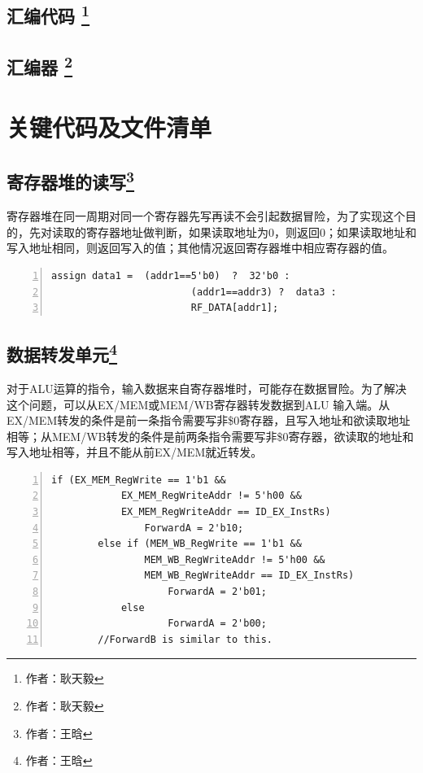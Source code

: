 \documentclass{article}
\begin{document}
        \subsection{汇编代码 \protect\footnote{作者：耿天毅}}

        \subsection{汇编器 \protect\footnote{作者：耿天毅}}

    \section{关键代码及文件清单}
        \subsection{寄存器堆的读写\protect\footnote{作者：王晗}}
            寄存器堆在同一周期对同一个寄存器先写再读不会引起数据冒险，为了实现这个目的，先对读取的寄存器地址做判断，如果读取地址为0，则返回0；如果读取地址和写入地址相同，则返回写入的值；其他情况返回寄存器堆中相应寄存器的值。
            \begin{Verbatim}[frame=lines,numbers=left,stepnumber=5,label={regfile.v}]
        assign data1 =  (addr1==5'b0)  ?  32'b0 :
                        (addr1==addr3) ?  data3 :
                        RF_DATA[addr1];
            \end{Verbatim}
            
        \subsection{数据转发单元\protect\footnote{作者：王晗}}
            对于ALU运算的指令，输入数据来自寄存器堆时，可能存在数据冒险。为了解决这个问题，可以从EX/MEM或MEM/WB寄存器转发数据到ALU 输入端。从EX/MEM转发的条件是前一条指令需要写非\$0寄存器，且写入地址和欲读取地址相等；从MEM/WB转发的条件是前两条指令需要写非\$0寄存器，欲读取的地址和写入地址相等，并且不能从前EX/MEM就近转发。
            \begin{Verbatim}[frame=lines,numbers=left,stepnumber=5,label={ForwardUnit.v}]
        if (EX_MEM_RegWrite == 1'b1 &&
        	EX_MEM_RegWriteAddr != 5'h00 &&
        	EX_MEM_RegWriteAddr == ID_EX_InstRs)
        		ForwardA = 2'b10;
        else if (MEM_WB_RegWrite == 1'b1 &&
        		MEM_WB_RegWriteAddr != 5'h00 &&
        		MEM_WB_RegWriteAddr == ID_EX_InstRs)
        			ForwardA = 2'b01;
        	else
        			ForwardA = 2'b00;
        //ForwardB is similar to this.
            \end{Verbatim}
            
\end{document}
